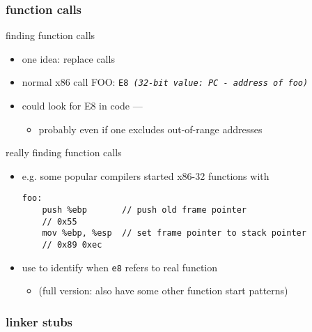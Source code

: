 \subsubsection{function calls}

\begin{frame}[fragile,label=findValidFindFunc]{finding function calls}
    \begin{itemize}
    \item one idea: replace calls
    \item normal x86 call FOO: {\tt E8 \textit{(32-bit value: PC - address of foo)}}
    \item could look for E8 in code --- 
        \begin{itemize}
        \item probably even if one excludes out-of-range addresses
        \end{itemize}
    \end{itemize}
\end{frame}

\begin{frame}[fragile,label=findValidFindFunc2]{really finding function calls}
\lstset{language=myasm,style=small}
    \begin{itemize}
    \item e.g. some popular compilers started x86-32 functions with
\begin{lstlisting}
foo:
    push %ebp       // push old frame pointer
    // 0x55
    mov %ebp, %esp  // set frame pointer to stack pointer
    // 0x89 0xec
\end{lstlisting}
    \item use to identify when {\tt e8} refers to real function
    \begin{itemize}
    \item (full version: also have some other function start patterns)
    \end{itemize}
    \end{itemize}
\end{frame}

\subsubsection{linker stubs}

